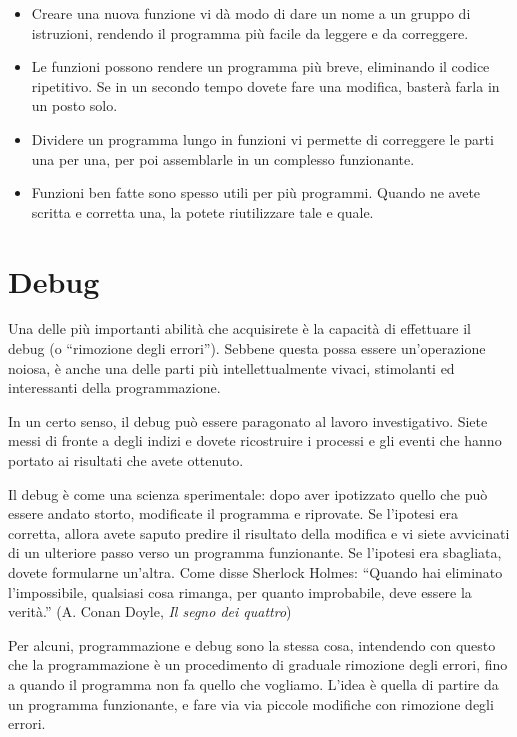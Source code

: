\documentclass[10pt]{book}
\begin{document}
\begin{itemize}

\item Creare una nuova funzione vi dà modo di dare un nome a un gruppo di istruzioni, rendendo il programma più facile da leggere e da correggere.

\item Le funzioni possono rendere un programma più breve, eliminando il codice ripetitivo. Se in un secondo tempo dovete fare una modifica, basterà farla in un posto solo.

\item Dividere un programma lungo in funzioni vi permette di correggere le parti una per una, per poi assemblarle in un complesso funzionante.

\item Funzioni ben fatte sono spesso utili per più programmi. Quando ne avete scritta e corretta una, la potete riutilizzare tale e quale.

\end{itemize}


\section{Debug}
\label{editor}

Una delle più importanti abilità che acquisirete è la capacità di effettuare il debug (o ``rimozione degli errori''). Sebbene questa possa essere un'operazione noiosa, è anche una delle parti più intellettualmente vivaci, stimolanti ed interessanti della programmazione.

In un certo senso, il debug può essere paragonato al lavoro investigativo. Siete messi di fronte a degli indizi e dovete ricostruire i processi e gli eventi che hanno portato ai risultati che avete ottenuto.

Il debug è come una scienza sperimentale: dopo aver ipotizzato quello che può essere andato storto, modificate il programma e riprovate. Se l'ipotesi era corretta, allora avete saputo predire il risultato della modifica e vi siete avvicinati di un ulteriore passo verso un programma funzionante. Se l'ipotesi era sbagliata, dovete formularne un'altra. Come disse Sherlock Holmes: ``Quando hai eliminato l'impossibile, qualsiasi cosa rimanga, per quanto improbabile, deve essere la verità.''
(A. Conan Doyle, {\em Il segno dei quattro})

Per alcuni, programmazione e debug sono la stessa cosa, intendendo con questo che la programmazione è un procedimento di graduale rimozione degli errori, fino a quando il programma non fa quello che vogliamo. L'idea è quella di partire da un programma funzionante, e fare via via piccole modifiche con rimozione degli errori.
\end{document}
